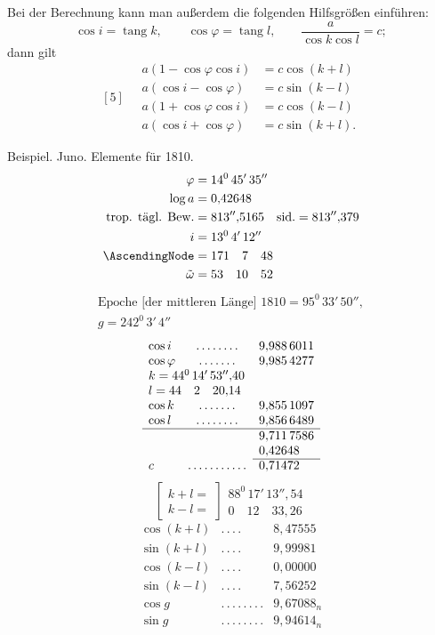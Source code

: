Bei der Berechnung kann man außerdem die folgenden Hilfsgrößen einführen:
\[
\cos i=\operatorname{tang}k,\qquad
\cos\varphi=\operatorname{tang}l,\qquad
\frac{a}{\cos k\cos l}=c;
\]
dann gilt
\[
[5]\quad\begin{aligned}
a(1-\cos\varphi\cos i)&=c\cos(k+l)\\
a(\cos i-\cos\varphi)&=c\sin(k-l)\\
a(1+\cos\varphi\cos i)&=c\cos(k-l)\\
a(\cos i+\cos\varphi)&=c\sin(k+l).
\end{aligned}
\]

Beispiel. Juno. Elemente für 1810.
\[
\begin{aligned}
\varphi&=14^0\,45'\,35''\\
\log a&=0{,}42648\\
\text{trop. tägl. Bew.}&=813''{,}5165\quad\text{sid.}=813''{,}379\\
i&=13^0\,4'\,12''\\
\AscendingNode&=171\quad7\quad48\\
\tilde\omega&=53\quad10\quad52
\end{aligned}
\]
\[
\begin{gathered}
\text{Epoche [der mittleren Länge] }1810=95^0\,33'\,50'',\\
g=242^0\,3'\,4''
\end{gathered}
\]
\[
\begin{array}{lcl}
\cos i&.\,.\,.\,.\,.\,.\,.\,.&9{,}988\,6011\\
\cos\varphi&.\,.\,.\,.\,.\,.\,.&9{,}985\,4277\\
\multicolumn{3}{l}{k=44^0\,14'\,53''{,}40}\\
\multicolumn{3}{l}{l=44\quad2\quad20{,}14}\\
\cos k&.\,.\,.\,.\,.\,.\,.&9{,}855\,1097\\
\cos l&.\,.\,.\,.\,.\,.\,.\,.&9{,}856\,6489\\
\hline
&&9{,}711\,7586\\
&&0{,}42648\\
\cline{3-3}
c&.\,.\,.\,.\,.\,.\,.\,.\,.\,.\,.&0{,}71472
\end{array}
\]
\[
\left[\begin{array}{l}k+l=\\k-l=\end{array}\right]
\begin{array}{l}88^0\,17'\,13''{,}54\\0\quad12\quad33{,}26\end{array}
\]
\[
\begin{array}{lcl}
\cos(k+l)&.\,.\,.\,.&8{,}47555\\
\sin(k+l)&.\,.\,.\,.&9{,}99981\\
\cos(k-l)&.\,.\,.\,.&0{,}00000\\
\sin(k-l)&.\,.\,.\,.&7{,}56252\\
\cos g&.\,.\,.\,.\,.\,.\,.\,.&9{,}67088_n\\
\sin g&.\,.\,.\,.\,.\,.\,.\,.&9{,}94614_n
\end{array}
\]
